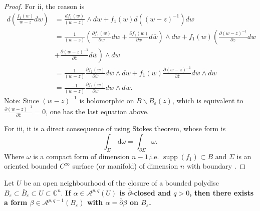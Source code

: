 \begin{proof}
For ii, the reason is
\begin{align*}
  d\left(\frac{f_1(w)}{w-z} d w\right) &=\frac{d f_1(w)}{(w-z)}\wedge d w+f_1(w) d\left((w-z)^{-1}\right) d w\\ 
  &=\frac{1}{(w-z)}\left(\frac{\partial f_1(w)}{\partial w} d w+ \frac{\partial f_1(w)}{\partial \overline{w}} d \overline{w}\right)\wedge d w+f_1(w) \left(\frac{\partial (w-z)^{-1} }{\partial z} d w\right.\\
  &\left.+ \frac{\partial (w-z)^{-1}}{\partial \overline{z}} d \overline{w}\right)\wedge d w\\ 
  &=\frac{1}{(w-z)}\frac{\partial f_1(w)}{\partial \overline{w}} d \overline{w}\wedge d w+f_1(w) \frac{\partial (w-z)^{-1}}{\partial \overline{z}} d \overline{w}\wedge d w\\
  &=\frac{-1}{(w-z)}\frac{\partial f_1(w)}{\partial \overline{w}}d w \wedge d \overline{w}.
\end{align*}
Note: Since $(w-z)^{-1}$ is holomorphic on $B\backslash B_\varepsilon(z)$, which is equivalent to $\frac{\partial (w-z)^{-1}}{\partial \overline{z}}=0$, one has the last equation above.

For iii, it is a direct consequence of using Stokes theorem, whose form is 
\[\int_\Sigma \,\mathrm{d} \omega=\int_{\partial \Sigma} \omega.\]
Where $\omega$ is a compact form of dimension $n-1$,i.e.  $\operatorname{supp} (f_1)\subset B$ and $\Sigma$ is an oriented bounded $C^\infty$ surface (or manifold) of dimension $n$ with boundary .

\end{proof}

\begin{lemma}
  Let $U$ be an open neighbourhood of the closure of a bounded polydisc $B_{\varepsilon} \subset \bar{B}_{\varepsilon} \subset U \subset \mathbb{C}^n$. \textbf{If $\alpha \in \mathcal{A}^{p, q}(U)$ is $\bar{\partial}$-closed and $q>0$, then there exists a form $\beta \in \mathcal{A}^{p, q-1}\left(B_{\varepsilon}\right)$ with $\alpha=\bar{\partial} \beta$ on $B_{\varepsilon}$.}
\end{lemma}

